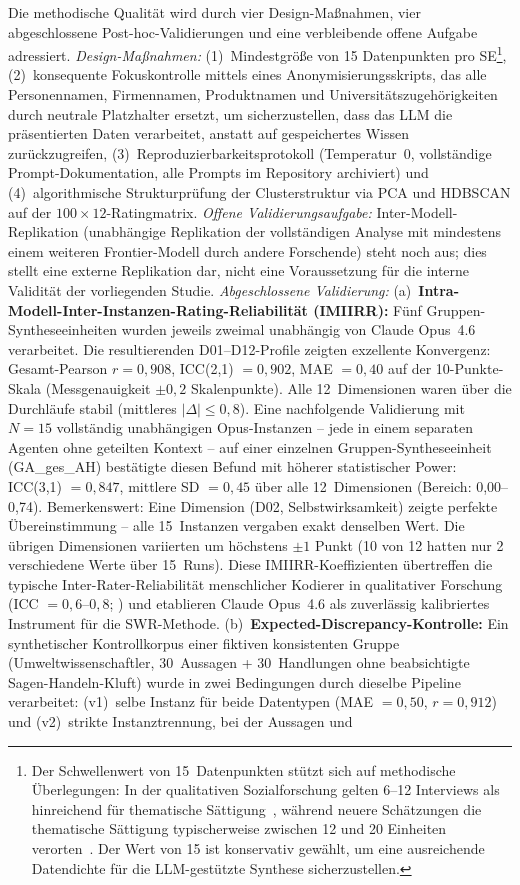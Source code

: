 \documentclass[12pt,a4paper]{article}
\begin{document}
Die methodische Qualität wird durch vier Design-Maßnahmen, vier abgeschlossene Post-hoc-Validierungen und eine verbleibende offene Aufgabe adressiert. \emph{Design-Maßnahmen:} (1)~Mindestgröße von 15 Datenpunkten pro SE\footnote{Der Schwellenwert von 15~Datenpunkten stützt sich auf methodische Überlegungen: In der qualitativen Sozialforschung gelten 6--12 Interviews als hinreichend für thematische Sättigung~\citep{StraussCorbin1990}, während neuere Schätzungen die thematische Sättigung typischerweise zwischen 12 und 20 Einheiten verorten~\citep{Guest2006, FugardPotts2015}. Der Wert von 15 ist konservativ gewählt, um eine ausreichende Datendichte für die LLM-gestützte Synthese sicherzustellen.}, (2)~konsequente Fokuskontrolle mittels eines Anonymisierungsskripts, das alle Personennamen, Firmennamen, Produktnamen und Universitätszugehörigkeiten durch neutrale Platzhalter ersetzt, um sicherzustellen, dass das LLM die präsentierten Daten verarbeitet, anstatt auf gespeichertes Wissen zurückzugreifen, (3)~Reproduzierbarkeitsprotokoll (Temperatur~0, vollständige Prompt-Dokumentation, alle Prompts im Repository archiviert) und (4)~algorithmische Strukturprüfung der Clusterstruktur via PCA und HDBSCAN auf der $100 \times 12$-Ratingmatrix. \emph{Offene Validierungsaufgabe:} Inter-Modell-Replikation (unabhängige Replikation der vollständigen Analyse mit mindestens einem weiteren Frontier-Modell durch andere Forschende) steht noch aus; dies stellt eine externe Replikation dar, nicht eine Voraussetzung für die interne Validität der vorliegenden Studie. \emph{Abgeschlossene Validierung:} (a)~\textbf{Intra-Modell-Inter-Instanzen-Rating-Reliabilität (IMIIRR):} Fünf Gruppen-Syntheseeinheiten wurden jeweils zweimal unabhängig von Claude Opus~4.6 verarbeitet. Die resultierenden D01--D12-Profile zeigten exzellente Konvergenz: Gesamt-Pearson $r = 0{,}908$, ICC(2,1) $= 0{,}902$, MAE $= 0{,}40$ auf der 10-Punkte-Skala (Messgenauigkeit $\pm 0{,}2$ Skalenpunkte). Alle 12~Dimensionen waren über die Durchläufe stabil (mittleres $|\Delta| \leq 0{,}8$). Eine nachfolgende Validierung mit $N = 15$ vollständig unabhängigen Opus-Instanzen -- jede in einem separaten Agenten ohne geteilten Kontext -- auf einer einzelnen Gruppen-Syntheseeinheit (GA\_ges\_AH) bestätigte diesen Befund mit höherer statistischer Power: ICC(3,1) $= 0{,}847$, mittlere SD $= 0{,}45$ über alle 12~Dimensionen (Bereich: 0,00--0,74). Bemerkenswert: Eine Dimension (D02, Selbstwirksamkeit) zeigte perfekte Übereinstimmung -- alle 15~Instanzen vergaben exakt denselben Wert. Die übrigen Dimensionen variierten um höchstens $\pm 1$ Punkt (10 von 12 hatten nur 2 verschiedene Werte über 15~Runs). Diese IMIIRR-Koeffizienten übertreffen die typische Inter-Rater-Reliabilität menschlicher Kodierer in qualitativer Forschung (ICC $= 0{,}6$--$0{,}8$; \citealt{Hallgren2012}) und etablieren Claude Opus~4.6 als zuverlässig kalibriertes Instrument für die SWR-Methode. (b)~\textbf{Expected-Discrepancy-Kontrolle:} Ein synthetischer Kontrollkorpus einer fiktiven konsistenten Gruppe (Umweltwissenschaftler, 30~Aussagen + 30~Handlungen ohne beabsichtigte Sagen-Handeln-Kluft) wurde in zwei Bedingungen durch dieselbe Pipeline verarbeitet: (v1)~selbe Instanz für beide Datentypen (MAE $= 0{,}50$, $r = 0{,}912$) und (v2)~strikte Instanztrennung, bei der Aussagen und 
\end{document}
